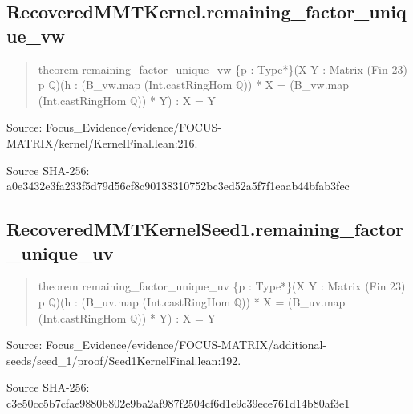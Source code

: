 \documentclass[11pt,a4paper]{article}
\begin{document}
\begin{samepage}
\subsection{RecoveredMMTKernel.remaining\_factor\_unique\_vw}
\begin{quote}\small\ttfamily theorem remaining\_factor\_unique\_vw \{p : Type*\}\newline     (X Y : Matrix (Fin 23) p \ensuremath{\mathbb{Q}})\newline     (h : (B\_vw.map (Int.castRingHom \ensuremath{\mathbb{Q}})) * X = (B\_vw.map (Int.castRingHom \ensuremath{\mathbb{Q}})) * Y) : X = Y\end{quote}
{\small Source: Focus\_Evidence/evidence/FOCUS-MATRIX/kernel/KernelFinal.lean:216.\par}

{\small Source SHA-256: a0e3432e3fa233f5d79d56cf8c90138310752bc3ed52a5f7f1eaab44bfab3fec\par}

\end{samepage}
\begin{samepage}
\subsection{RecoveredMMTKernelSeed1.remaining\_factor\_unique\_uv}
\begin{quote}\small\ttfamily theorem remaining\_factor\_unique\_uv \{p : Type*\}\newline     (X Y : Matrix (Fin 23) p \ensuremath{\mathbb{Q}})\newline     (h : (B\_uv.map (Int.castRingHom \ensuremath{\mathbb{Q}})) * X = (B\_uv.map (Int.castRingHom \ensuremath{\mathbb{Q}})) * Y) : X = Y\end{quote}
{\small Source: Focus\_Evidence/evidence/FOCUS-MATRIX/additional-seeds/seed\_1/proof/Seed1KernelFinal.lean:192.\par}

{\small Source SHA-256: c3e50cc5b7cfae9880b802e9ba2af987f2504cf6d1e9c39ece761d14b80af3e1\par}

\end{samepage}
\end{document}
